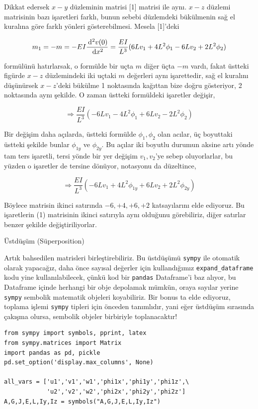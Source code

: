 \documentclass[12pt,fleqn]{article}\usepackage{../../common}
\begin{document}
Dikkat edersek $x-y$ düzleminin matrisi [1] matrisi ile aynı. $x-z$ düzlemi
matrisinin bazı işaretleri farklı, bunun sebebi düzlemdeki bükülmenin sağ el
kuralına göre farklı yönleri gösterebilmesi. Mesela [1]'deki 

$$
m_1 = -m = -EI \frac{\,\mathrm{d}^2 v(0)}{\,\mathrm{d} x^2} =
\frac{EI}{L^3} ( 6L v_1 + 4L^2 \phi_1 - 6L v_2 + 2 L^2 \phi_2 )
$$

formülünü hatırlarsak, o formülde bir uçta $m$ diğer üçta $-m$ vardı, fakat
üstteki figürde $x-z$ düzlemindeki iki uçtaki $m$ değerleri aynı işarettedir,
sağ el kuralını düşünürsek $x-z$'deki bükülme 1 noktasında kağıttan bize doğru
gösteriyor, 2 noktasında aynı şekilde. O zaman üstteki formüldeki işaretler
değişir,

$$
\Rightarrow \frac{EI}{L^3} ( -6L v_1 - 4L^2 \phi_1 + 6L v_2 - 2 L^2 \phi_2 )
$$

Bir değişim daha açılarda, üstteki formülde $\phi_1,\phi_2$ olan acılar,
üç boyuttaki üstteki şekilde bunlar $\phi_{1y}$ ve $\phi_{2y}$. Bu açılar
iki boyutlu durumun aksine artı yönde tam ters işaretli, tersi yönde bir
yer değişim $v_1,v_2$'ye sebep oluyorlarlar, bu yüzden o işaretler de
tersine dönüyor, notasyonu da düzeltince,

$$
\Rightarrow \frac{EI}{L^3} ( -6L v_1 + 4L^2 \phi_{1y} + 6L v_2 + 2 L^2 \phi_{2y} )
$$

Böylece matrisin ikinci satırında $-6,+4,+6,+2$ katsayılarını elde ediyoruz.
Bu işaretlerin (1) matrisinin ikinci satırıyla aynı olduğunu görebiliriz,
diğer satırlar benzer şekilde değiştiriliyorlar.

Üstdüşüm (Süperposition)

Artık bahsedilen matrisleri birleştirebiliriz. Bu üstdüşümü \verb!sympy!  ile
otomatik olarak yapacağız, daha önce sayısal değerler için kullandığımız
\verb!expand_dataframe! kodu yine kullanılabilecek, çünkü kod bir \verb!pandas!
Dataframe'i baz alıyor, bu Dataframe içinde herhangi bir obje depolamak mümkün,
oraya sayılar yerine \verb!sympy! sembolik matematik objeleri koyabiliriz. Bir
bonus ta elde ediyoruz, toplama işlemi \verb!sympy! tipleri için önceden
tanımlıdır, yani eğer üstdüşüm sırasında çakışma olursa, sembolik objeler
birbiriyle toplanacaktır!

\begin{verbatim}
from sympy import symbols, pprint, latex
from sympy.matrices import Matrix
import pandas as pd, pickle
pd.set_option('display.max_columns', None)

all_vars = ['u1','v1','w1','phi1x','phi1y','phi1z',\
            'u2','v2','w2','phi2x','phi2y','phi2z']
A,G,J,E,L,Iy,Iz = symbols("A,G,J,E,L,Iy,Iz")
\end{verbatim}
\end{document}
